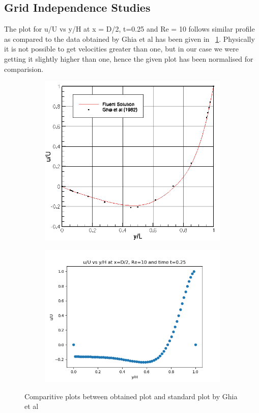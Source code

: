 \documentclass{article}
\begin{document}
\subsection{Grid Independence Studies}
The plot for u/U vs y/H at x = D/2, t=0.25 and Re = 10 follows similar profile as compared to the data obtained by Ghia et al has been given in ~\ref{fig:res2}. Physically it is not possible to get velocities greater than one, but in our case we were getting it slightly higher than one, hence the given plot has been normalised for comparision.

\begin{figure}
  \begin{subfigure}[b]{0.5\textwidth}
    \includegraphics[width=\textwidth]{ghia.png}
  \end{subfigure}
  \begin{subfigure}[b]{0.6\textwidth}
    \includegraphics[width=\textwidth]{ghia2.png}
  \end{subfigure}
      \caption{Comparitive plots between obtained plot and standard plot by Ghia et al}
\label{fig:res2}
\end{figure}
\end{document}
